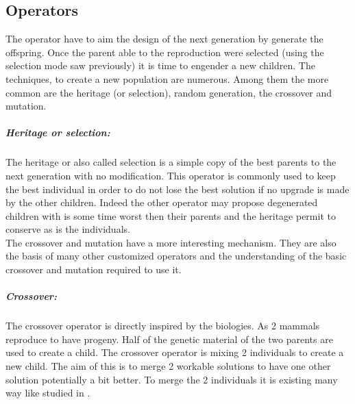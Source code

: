 %	
\subsection{Operators }


The operator have to aim the design of the next generation by generate the offspring. 
Once the parent able to the reproduction were selected (using the selection mode saw previously) it is time to engender a new children.
The techniques, to create a new population are numerous. Among them the more common  are the heritage (or selection), random generation, the crossover and mutation. 

\subparagraph{Heritage or selection:}
The heritage or also called selection is a simple copy of the best parents to the next generation with no modification. This operator is commonly used to keep the best individual in order to do not lose the best solution if no upgrade is made by the other children. Indeed the other operator may propose degenerated children with is some time worst then their parents and the heritage  permit to conserve as is the individuals.
\\
The crossover and mutation have a more interesting mechanism. They are also the basis of many other customized operators and the understanding of the basic crossover and mutation required to use it.
 
 
\subparagraph{Crossover:} 

The crossover operator is directly inspired by the biologies. As 2 mammals reproduce to have progeny. Half of the genetic material of the two parents are used to create a child.
The crossover operator is mixing 2 individuals to create a new child. The aim of this is to merge 2 workable solutions to have one other solution potentially a bit better. To merge the 2 individuals it is existing many way like studied in \cite{113*mais2010}.
 
